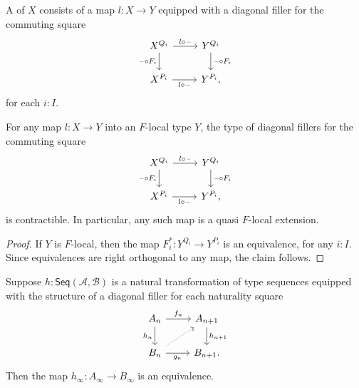 \begin{defn}
A  of $X$ consists of a map $l:X\to Y$ equipped with a diagonal filler for the commuting square
\begin{equation*}
\begin{tikzcd}
X^{Q_i} \arrow[r,"l\circ\blank"] \arrow[d,swap,"\blank\circ F_i"] & Y^{Q_i} \arrow[d,"\blank\circ F_i"] \\
X^{P_i} \arrow[r,swap,"l\circ \blank"] & Y^{P_i},
\end{tikzcd}
\end{equation*}
for each $i:I$.
\end{defn}

\begin{lem}\label{lem:qflocal_local}
For any map $l:X\to Y$ into an $F$-local type $Y$, the type of diagonal fillers for the commuting square
\begin{equation*}
\begin{tikzcd}
X^{Q_i} \arrow[r,"l\circ\blank"] \arrow[d,swap,"\blank\circ F_i"] & Y^{Q_i} \arrow[d,"\blank\circ F_i"] \\
X^{P_i} \arrow[r,swap,"l\circ \blank"] & Y^{P_i},
\end{tikzcd}
\end{equation*}
is contractible. In particular, any such map is a quasi $F$-local extension.
\end{lem}

\begin{proof}
If $Y$ is $F$-local, then the map $F_i^\ast : Y^{Q_i}\to Y^{P_i}$ is an equivalence, for any $i:I$. Since equivalences are right orthogonal to any map, the claim follows.
\end{proof}

\begin{lem}\label{lem:equiv_colim_diagfiller}
Suppose $h:\mathsf{Seq}(\mathcal{A},\mathcal{B})$ is a natural transformation of type sequences equipped with the structure of a diagonal filler for each naturality square
\begin{equation*}
\begin{tikzcd}
A_n \arrow[r,"f_n"] \arrow[d,swap,"h_n"] & A_{n+1} \arrow[d,"h_{n+1}"] \\
B_n \arrow[r,swap,"g_n"] \arrow[ur,densely dotted] & B_{n+1}.
\end{tikzcd}
\end{equation*}
Then the map $h_\infty : A_\infty\to B_\infty$ is an equivalence. 
\end{lem}


